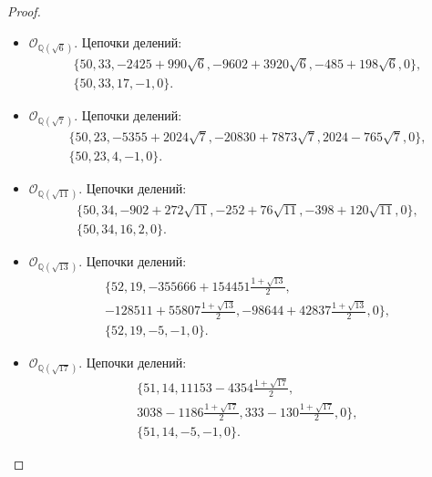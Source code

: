 \documentclass[_00_dissertation.tex]{subfiles}
\begin{document}
\begin{proof}
\begin{itemize}
        \item $\mathcal{O}_{\mathbb{Q}(\sqrt{6})}$.
        Цепочки делений:
        \begin{equation*}
            \begin{split}
                \{50, 33, -2425+990\sqrt{6}, -9602+3920\sqrt{6}, -485+198\sqrt{6}, 0\},\\
                \{50, 33, 17, -1, 0\}.
            \end{split}
        \end{equation*}
    
        \item $\mathcal{O}_{\mathbb{Q}(\sqrt{7})}$.
        Цепочки делений:
        \begin{equation*}
            \begin{split}
                \{50, 23, -5355+2024\sqrt{7}, -20830+7873\sqrt{7}, 2024-765\sqrt{7}, 0\},\\
                \{50, 23, 4, -1, 0\}.
            \end{split}
        \end{equation*}
    
        \item $\mathcal{O}_{\mathbb{Q}(\sqrt{11})}$.
        Цепочки делений:
        \begin{equation*}
            \begin{split}
                \{50, 34, -902+272\sqrt{11}, -252+76\sqrt{11}, -398+120\sqrt{11}, 0\},\\
                \{50, 34, 16, 2, 0\}.
            \end{split}
        \end{equation*}
    
        \item $\mathcal{O}_{\mathbb{Q}(\sqrt{13})}$.
        Цепочки делений:
        \begin{equation*}
            \begin{split}
                \{52, 19, -355666+154451\frac{1+\sqrt{13}}{2},\\
                    -128511+55807\frac{1+\sqrt{13}}{2}, -98644+42837\frac{1+\sqrt{13}}{2}, 0\},\\
                \{52, 19, -5, -1, 0\}.
            \end{split}
        \end{equation*}
    
        \item $\mathcal{O}_{\mathbb{Q}(\sqrt{17})}$.
        Цепочки делений:
        \begin{equation*}
            \begin{split}
                \{51, 14, 11153-4354\frac{1+\sqrt{17}}{2},\\
                    3038-1186\frac{1+\sqrt{17}}{2}, 333-130\frac{1+\sqrt{17}}{2}, 0\},\\
                \{51, 14, -5, -1, 0\}.
            \end{split}
        \end{equation*}
    

\end{itemize}
\end{proof}
\end{document}
